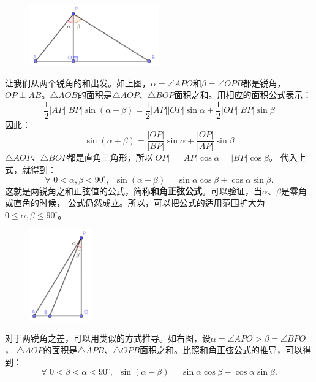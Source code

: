 \documentclass[12pt,UTF8]{ctexbook}
\begin{document}
\begin{figure}[H] %
    \vspace{4pt}
    \centering
    \includegraphics[width=0.5\textwidth]{tu/和角正弦公式1.png}
\end{figure}

让我们从两个锐角的和出发。如上图，$\alpha = \angle APO$和$\beta = \angle OPB$都是锐角，
$OP \perp AB$。$\triangle AOB$的面积是$\triangle AOP$、$\triangle BOP$面积之和。用相应的面积公式表示：
$$ \frac12 |AP||BP|\sin(\alpha + \beta) = \frac12 |AP||OP|\sin\alpha + \frac12 |OP||BP|\sin\beta$$
因此：
$$ \sin(\alpha + \beta) = \frac{|OP|}{|BP|}\sin\alpha + \frac{|OP|}{|AP|}\sin\beta$$
$\triangle AOP$、$\triangle BOP$都是直角三角形，所以$|OP| = |AP|\cos \alpha = |BP|\cos \beta$。
代入上式，就得到：
$$ \forall \,\, 0 < \alpha, \beta < 90^\circ , \,\,\, \sin(\alpha + \beta) = \sin\alpha \cos \beta + \cos \alpha \sin\beta.$$
这就是两锐角之和正弦值的公式，简称\textbf{和角正弦公式}。可以验证，当$\alpha$、$\beta$是零角或直角的时候，
公式仍然成立。所以，可以把公式的适用范围扩大为$0 \leqslant \alpha , \beta \leqslant 90^\circ$。

\begin{figure} %
    \vspace{-45pt}
    \flushright
    \includegraphics[width=0.24\textwidth]{tu/差角正弦公式1.png}
\end{figure}

对于两锐角之差，可以用类似的方式推导。如右图，设$\alpha = \angle APO > \beta = \angle BPO$，
$\triangle AOP$的面积是$\triangle APB$、$\triangle OPB$面积之和。比照和角正弦公式的推导，可以得到：
$$ \forall \,\, 0 <  \beta < \alpha < 90^\circ , \,\,\, \sin(\alpha - \beta) = \sin\alpha \cos \beta - \cos \alpha \sin\beta.$$
\end{document}
